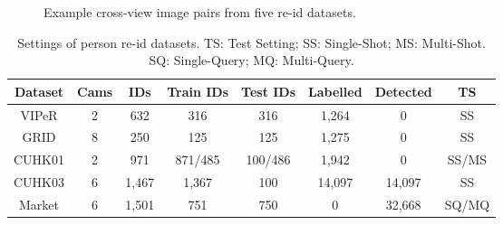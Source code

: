 \documentclass{article}
\begin{document}
\begin{figure} [ht]
	\centering
{}
	\vskip -0.5cm
	\caption{\footnotesize
		Example cross-view image pairs from five re-id datasets.
}
	\label{fig:dataset}
\end{figure}
\begin{table}[h!] \footnotesize
	\centering
\renewcommand{\arraystretch}{1}
	\setlength{\tabcolsep}{0.02cm}
	\vspace{-0.5cm}
	\caption{\footnotesize
		Settings of person re-id datasets.
		TS: Test Setting;
		SS: Single-Shot; MS: Multi-Shot.
		SQ: Single-Query; MQ: Multi-Query.
	}
	\vskip 0pt \begin{tabular}{|c||c|c|c|c|c|c|c|}
		\hline
		Dataset  & 
		{Cams} &
		{IDs} & 
		{Train IDs} & 
		{Test IDs} &
		{Labelled} & 
		{Detected} &
		TS \\ \hline \hline VIPeR & 2 & 632 & 316 & 316 & 1,264 & 0 & SS \\  GRID & 8 & 250 & 125 & 125 & 1,275 & 0 & SS \\  CUHK01 & 2 & 971 & 871/485 & 100/486 & 1,942 & 0 & SS/MS\\
		CUHK03 & 6 & 1,467 & 1,367 & 100 & 14,097 & 14,097 & SS\\
		Market & 6  & 1,501& 751 & 750 & 0 & 32,668 & SQ/MQ \\
		\hline
	\end{tabular}\label{tab:dataset_stats}
	\vspace{-0.3cm}
\end{table}
\end{document}
